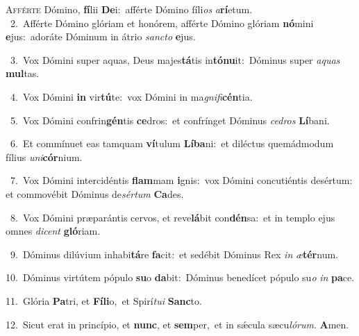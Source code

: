 \lettrine{\initial\textcolor{\initialcolor}{A}}{fférte} Dómino, \textbf{fí}\-lii \textbf{De}\-i:~\star afférte Dómino fíli\textit{os} \textit{a}\-\textbf{rí}etum.\\
{\numbfont\textcolor{\numbcolor}{~2.}}~Afférte Dómino glóriam et honórem, afférte Dómino glóriam \textbf{nó}\-mini \textbf{e}\-jus:~\star adoráte Dóminum in átrio \textit{sanc}\-\textit{to} \textbf{e}\-jus.\par
{\numbfont\textcolor{\numbcolor}{~3.}}~Vox Dómini super aquas, Deus majes\-\textbf{tá}\-tis in\-\textbf{tó}\-\textbf{nu}it:~\star Dóminus super \textit{a}\-\textit{quas} \textbf{mul}\-tas.\par
{\numbfont\textcolor{\numbcolor}{~4.}}~Vox Dómini \textbf{in} vir\-\textbf{tú}\-te:~\star vox Dómini in ma\-\textit{gni}\-\textit{fi}\textbf{cén}tia.\par
{\numbfont\textcolor{\numbcolor}{~5.}}~Vox Dómini confrin\-\textbf{gén}\-tis \textbf{ce}\-dros:~\star et confrínget Dóminus \textit{ce}\-\textit{dros} \textbf{Lí}\-bani.\par
{\numbfont\textcolor{\numbcolor}{~6.}}~Et commínuet eas tamquam \textbf{ví}\-tulum \textbf{Lí}\-\textbf{ba}ni:~\star et diléctus quemádmodum fílius \textit{u}\-\textit{ni}\textbf{cór}nium.\par
{\numbfont\textcolor{\numbcolor}{~7.}}~Vox Dómini intercidéntis \textbf{flam}\-mam \textbf{i}\-gnis:~\star vox Dómini concutiéntis desértum: et commovébit Dóminus de\-\textit{sér}\-\textit{tum} \textbf{Ca}\-des.\par
{\numbfont\textcolor{\numbcolor}{~8.}}~Vox Dómini præparántis cervos, et reve\-\textbf{lá}\-bit con\-\textbf{dén}\-sa:~\star et in templo ejus omnes \textit{di}\-\textit{cent} \textbf{gló}\-riam.\par
{\numbfont\textcolor{\numbcolor}{~9.}}~Dóminus dilúvium inhabi\-\textbf{tá}\-re \textbf{fa}\-cit:~\star et sedébit Dóminus Rex \textit{in} \textit{æ}\-\textbf{tér}num.\par
{\numbfont\textcolor{\numbcolor}{10.}}~Dóminus virtútem pópulo \textbf{su}\-o \textbf{da}\-bit:~\star Dóminus benedícet pópulo su\textit{o} \textit{in} \textbf{pa}\-ce.\par
{\numbfont\textcolor{\numbcolor}{11.}}~Glória \textbf{Pa}\-tri, et \textbf{Fí}\-\textbf{li}o,~\star et Spirí\-\textit{tu}\-\textit{i} \textbf{Sanc}\-to.\par
{\numbfont\textcolor{\numbcolor}{12.}}~Sicut erat in princípio, et \textbf{nunc}\-, et \textbf{sem}\-per,~\star et in sǽcula sæcu\-\textit{ló}\-\textit{rum}. \textbf{A}\-men.\par
